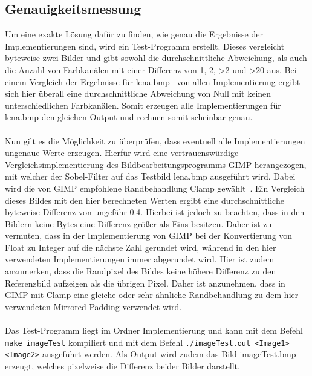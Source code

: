 \documentclass[course=asp]{aspdoc}
\begin{document}
\subsection{Genauigkeitsmessung}
Um eine exakte Lösung dafür zu finden, wie genau die Ergebnisse der Implementierungen sind, wird ein Test-Programm erstellt. Dieses vergleicht byteweise zwei Bilder und gibt sowohl die durchschnittliche Abweichung, als auch die Anzahl von Farbkanälen mit einer Differenz von 1, 2, >2 und >20 aus. Bei einem Vergleich der Ergebnisse für lena.bmp~\cite{lenabmp} von allen Implementierung ergibt sich hier überall eine durchschnittliche Abweichung von Null mit keinen unterschiedlichen Farbkanälen. Somit erzeugen alle Implementierungen für lena.bmp den gleichen Output und rechnen somit scheinbar genau.\\\\ Nun gilt es die Möglichkeit zu überprüfen, dass eventuell alle Implementierungen ungenaue Werte erzeugen. Hierfür wird eine vertrauenswürdige Vergleichsimplementierung des Bildbearbeitungsprogramms GIMP herangezogen, mit welcher der Sobel-Filter auf das Testbild lena.bmp ausgeführt wird. Dabei wird die von GIMP empfohlene Randbehandlung Clamp gewählt~\cite{gimpdoc}. Ein Vergleich dieses Bildes mit den hier berechneten Werten ergibt eine durchschnittliche byteweise Differenz von ungefähr 0.4. Hierbei ist jedoch zu beachten, dass in den Bildern keine Bytes eine Differenz größer als Eins besitzen. Daher ist zu vermuten, dass in der Implementierung von GIMP bei der Konvertierung von Float zu Integer auf die nächste Zahl gerundet wird, während in den hier verwendeten Implementierungen immer abgerundet wird. Hier ist zudem anzumerken, dass die Randpixel des Bildes keine höhere Differenz zu den Referenzbild aufzeigen als die übrigen Pixel. Daher ist anzunehmen, dass in GIMP mit Clamp eine gleiche oder sehr ähnliche Randbehandlung zu dem hier verwendeten Mirrored Padding verwendet wird.\\\\ Das Test-Programm liegt im Ordner Implementierung und kann mit dem Befehl \texttt{make imageTest} kompiliert und mit dem Befehl \texttt{./imageTest.out <Image1> <Image2>} ausgeführt werden. Als Output wird zudem das Bild imageTest.bmp erzeugt, welches pixelweise die Differenz beider Bilder darstellt.\\
\\[1ex]
\end{document}
